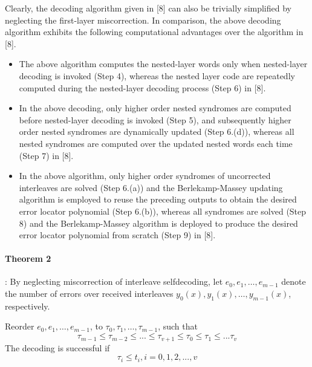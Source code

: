 \documentclass[fontsize=12pt]{article}
\begin{document}
 Clearly, the decoding algorithm given in [8] can also be
trivially simplified by neglecting the first-layer miscorrection.
In comparison, the above decoding algorithm exhibits
the following computational advantages over the algorithm
in [8]. \begin{itemize} \item The above algorithm computes the nested-layer
words only when nested-layer decoding is invoked (Step 4),
whereas the nested layer code are repeatedly computed during
the nested-layer decoding process (Step 6) in [8]. \item In the
above decoding, only higher order nested syndromes are
computed before nested-layer decoding is invoked (Step 5),
and subsequently higher order nested syndromes are dynamically
updated (Step 6.(d)), whereas all nested syndromes are
computed over the updated nested words each time (Step 7)
in [8]. \item In the above algorithm, only higher order syndromes
of uncorrected interleaves are solved (Step 6.(a)) and
the Berlekamp-Massey updating algorithm is employed to
reuse the preceding outputs to obtain the desired error locator
polynomial (Step 6.(b)), whereas all syndromes are solved
(Step 8) and the Berlekamp-Massey algorithm is deployed
to produce the desired error locator polynomial from scratch
(Step 9) in [8].
\end{itemize}

\paragraph{Theorem 2}: By neglecting miscorrection of interleave selfdecoding,
let $e_0, e_1, …, e_{m-1}$ denote the number of errors over
received interleaves $y_0(x), y_1(x), …, y_{m−1}(x)$, respectively.

Reorder $e_0, e_1, …, e_{m-1}$, to $\tau_0, \tau_1, …, \tau_{m−1}$, such that
\begin{equation}\tau_{m−1} \leq \tau_{m−2} \leq . . . \leq \tau_{v+1} \leq \tau_0 \leq \tau_1 \leq . . . \tau_v \end{equation}
The decoding is successful if
\begin{equation}
\tau_i ≤ t_i , i = 0, 1, 2, . . . , v 
\end{equation}
\end{document}
